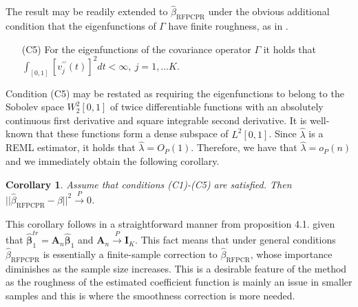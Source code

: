 \documentclass[11pt]{article}
\newtheorem{cor}{Corollary}[section]
\begin{document}
The result may be readily extended to $\hat{\beta}_{{\scriptscriptstyle \text{RFPCPR}}}$ under the obvious additional condition that the eigenfunctions of $\Gamma$ have finite roughness, as in \citet{silverman1996smoothed}.

\begin{itemize}
\item[(C5)] For the eigenfunctions of the covariance operator $\Gamma$ it holds that $\int_{[0,1]} [v_j^{\prime \prime}(t)]^2 dt < \infty, \ j = 1, \ldots K$.
\end{itemize}
Condition (C5) may be restated as requiring the eigenfunctions to belong to the Sobolev space $W^2_2[0,1]$ of twice differentiable functions with an absolutely continuous first derivative and square integrable second derivative. It is well-known that these functions form a dense subspace of $L^2[0,1]$. Since $\widehat{\lambda}$ is a REML estimator, it holds that $\widehat{\lambda} = O_P(1)$.  Therefore, we have that $\widehat{\lambda} = o_{P}(n)$ and we immediately obtain the following corollary.
\begin{cor}
Assume that conditions (C1)-(C5) are satisfied. Then $|| \widehat{\beta}_{{\scriptscriptstyle \text{RFPCPR}}} - \beta||^2 \xrightarrow{P} 0 $.
\end{cor}
\noindent
This corollary follows in a straightforward manner from proposition 4.1. given that $\widehat{\boldsymbol{\beta}}_1^{tr} = \mathbf{A}_n \widehat{\boldsymbol{\beta}}_1$ and $\mathbf{A}_n \xrightarrow{P}\mathbf{I}_K$. This fact means that under general conditions $\widehat{\beta}_{{\scriptscriptstyle \text{RFPCPR}}}$ is essentially a finite-sample correction to $\hat{\beta}_{{\scriptscriptstyle \text{RFPCR}}}$, whose importance diminishes as the sample size increases. This is a desirable feature of the method as the roughness of the estimated coefficient function is mainly an issue in smaller samples and this is where the smoothness correction is more needed.
\end{document}
